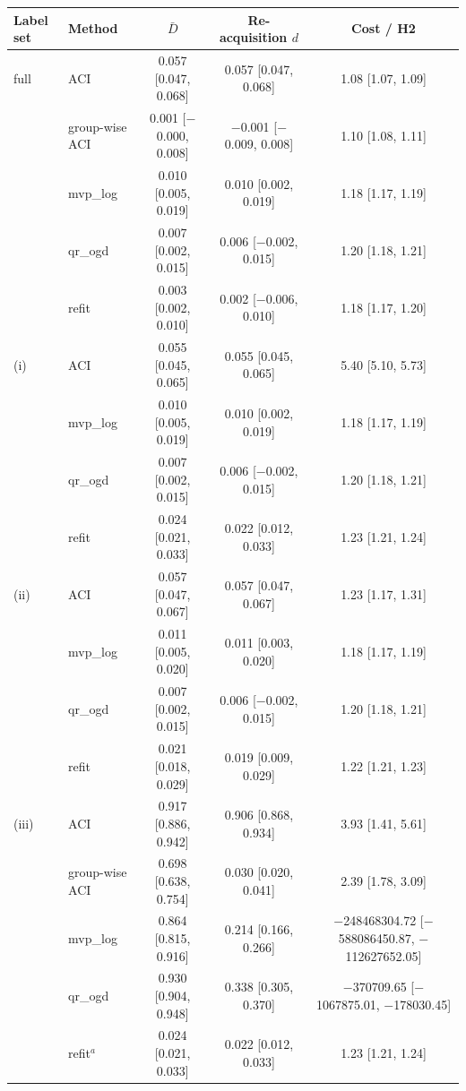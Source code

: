 \begin{tabular}{@{}llccc@{}}
\toprule
Label set & Method & $\bar{D}$ & Re-acquisition $d$ & Cost / H2 \\
\midrule
full & ACI & 0.057 [0.047, 0.068] & 0.057 [0.047, 0.068] & 1.08 [1.07, 1.09] \\
 & group-wise ACI & 0.001 [$-$0.000, 0.008] & $-$0.001 [$-$0.009, 0.008] & 1.10 [1.08, 1.11] \\
 & mvp\_log & 0.010 [0.005, 0.019] & 0.010 [0.002, 0.019] & 1.18 [1.17, 1.19] \\
 & qr\_ogd & 0.007 [0.002, 0.015] & 0.006 [$-$0.002, 0.015] & 1.20 [1.18, 1.21] \\
 & refit & 0.003 [0.002, 0.010] & 0.002 [$-$0.006, 0.010] & 1.18 [1.17, 1.20] \\
\addlinespace
(i) & ACI & 0.055 [0.045, 0.065] & 0.055 [0.045, 0.065] & 5.40 [5.10, 5.73] \\
 & mvp\_log & 0.010 [0.005, 0.019] & 0.010 [0.002, 0.019] & 1.18 [1.17, 1.19] \\
 & qr\_ogd & 0.007 [0.002, 0.015] & 0.006 [$-$0.002, 0.015] & 1.20 [1.18, 1.21] \\
 & refit & 0.024 [0.021, 0.033] & 0.022 [0.012, 0.033] & 1.23 [1.21, 1.24] \\
\addlinespace
(ii) & ACI & 0.057 [0.047, 0.067] & 0.057 [0.047, 0.067] & 1.23 [1.17, 1.31] \\
 & mvp\_log & 0.011 [0.005, 0.020] & 0.011 [0.003, 0.020] & 1.18 [1.17, 1.19] \\
 & qr\_ogd & 0.007 [0.002, 0.015] & 0.006 [$-$0.002, 0.015] & 1.20 [1.18, 1.21] \\
 & refit & 0.021 [0.018, 0.029] & 0.019 [0.009, 0.029] & 1.22 [1.21, 1.23] \\
\addlinespace
(iii) & ACI & 0.917 [0.886, 0.942] & 0.906 [0.868, 0.934] & 3.93 [1.41, 5.61] \\
 & group-wise ACI & 0.698 [0.638, 0.754] & 0.030 [0.020, 0.041] & 2.39 [1.78, 3.09] \\
 & mvp\_log & 0.864 [0.815, 0.916] & 0.214 [0.166, 0.266] & $-$248468304.72 [$-$588086450.87, $-$112627652.05] \\
 & qr\_ogd & 0.930 [0.904, 0.948] & 0.338 [0.305, 0.370] & $-$370709.65 [$-$1067875.01, $-$178030.45] \\
 & refit$^a$ & 0.024 [0.021, 0.033] & 0.022 [0.012, 0.033] & 1.23 [1.21, 1.24] \\

\end{tabular}
